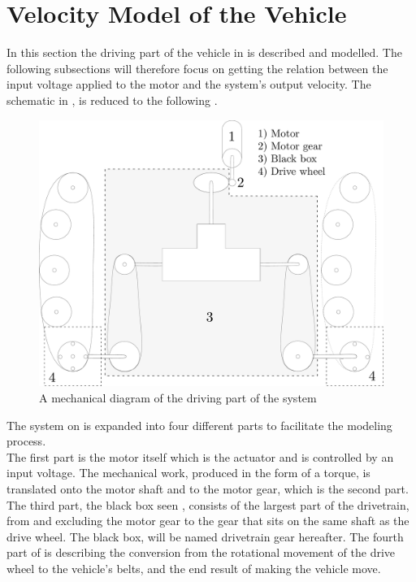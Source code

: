 \section{Velocity Model of the Vehicle}
In this section the driving part of the vehicle in  is described and modelled. The following subsections will therefore focus on getting the relation between the input voltage applied to the motor and the system's output velocity. The schematic in ,  is reduced to the following .

\begin{figure}[H]
	\centering
	\includegraphics[scale=0.2]{figures/vehicleDescriptionDriveTrainBlackBox.pdf}
	\caption{A mechanical diagram of the driving part of the system}
	\label{fig:vehicleDescriptionDriveTrainBlackBox}
\end{figure}

The system on  is expanded into four different parts to facilitate the modeling process.\\
The first part is the motor itself which is the actuator and is controlled by an input voltage. The mechanical work, produced in the form of a torque, is translated onto the motor shaft and to the motor gear, which is the second part.
The third part, the black box seen , consists of the largest part of the drivetrain, from and excluding the motor gear to the gear that sits on the same shaft as the drive wheel. The black box, will be named drivetrain gear hereafter.
The fourth part of  is describing the conversion from the rotational movement of the drive wheel to the vehicle's belts, and the end result of making the vehicle move.

